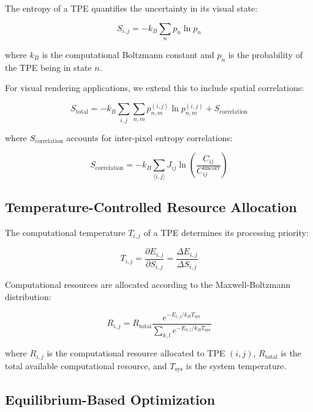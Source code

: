 \documentclass[12pt,a4paper]{article}
\begin{document}
The entropy of a TPE quantifies the uncertainty in its visual state:

\begin{equation}
S_{i,j} = -k_B \sum_{n} p_n \ln p_n
\end{equation}

where $k_B$ is the computational Boltzmann constant and $p_n$ is the probability of the TPE being in state $n$.

For visual rendering applications, we extend this to include spatial correlations:

\begin{equation}
S_{\text{total}} = -k_B \sum_{i,j} \sum_{n,m} p_{n,m}^{(i,j)} \ln p_{n,m}^{(i,j)} + S_{\text{correlation}}
\end{equation}

where $S_{\text{correlation}}$ accounts for inter-pixel entropy correlations:

\begin{equation}
S_{\text{correlation}} = -k_B \sum_{\langle i,j \rangle} J_{ij} \ln\left(\frac{C_{ij}}{C_{ij}^{\text{uncorr}}}\right)
\end{equation}

\subsection{Temperature-Controlled Resource Allocation}

The computational temperature $T_{i,j}$ of a TPE determines its processing priority:

\begin{equation}
T_{i,j} = \frac{\partial E_{i,j}}{\partial S_{i,j}} = \frac{\Delta E_{i,j}}{\Delta S_{i,j}}
\end{equation}

Computational resources are allocated according to the Maxwell-Boltzmann distribution:

\begin{equation}
R_{i,j} = R_{\text{total}} \frac{e^{-E_{i,j}/k_B T_{\text{sys}}}}{\sum_{k,l} e^{-E_{k,l}/k_B T_{\text{sys}}}}
\end{equation}

where $R_{i,j}$ is the computational resource allocated to TPE $(i,j)$, $R_{\text{total}}$ is the total available computational resource, and $T_{\text{sys}}$ is the system temperature.

\subsection{Equilibrium-Based Optimization}
\end{document}

